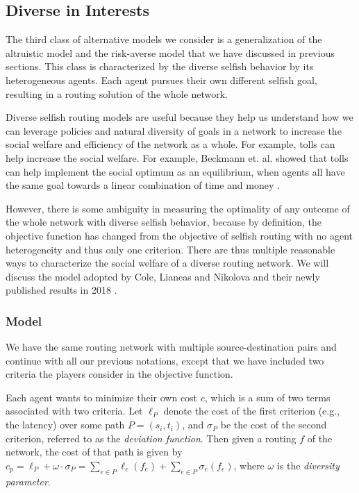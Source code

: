 \subsection{Diverse in Interests}\label{sec:diversity}

The third class of alternative models we consider is a generalization of the altruistic model and the risk-averse model that we have discussed in previous sections. This class is characterized by the diverse selfish behavior by its heterogeneous agents. Each agent pursues their own different selfish goal, resulting in a routing solution of the whole network. 

Diverse selfish routing models are useful because they help us understand how we can leverage policies and natural diversity of goals in a network to increase the social welfare and efficiency of the network as a whole. For example, tolls can help increase the social welfare. For example, Beckmann et. al. showed that tolls can help implement the social optimum as an equilibrium, when agents all have the same goal towards a linear combination of time and money \cite{beckmann1956studies}.

However, there is some ambiguity in measuring the optimality of any outcome of the whole network with diverse selfish behavior, because by definition, the objective function has changed from the objective of selfish routing with no agent heterogeneity and thus only one criterion. There are thus multiple reasonable ways to characterize the social welfare of a diverse routing network. We will discuss the model adopted by Cole, Lianeas and Nikolova and their newly published results in 2018 \cite{ijcai2018-24}.

\subsubsection{Model}

We have the same routing network with multiple source-destination pairs and continue with all our previous notations, except that we have included two criteria the players consider in the objective function.

Each agent wants to minimize their own cost $c$, which is a sum of two terms associated with two criteria. Let $\ell_P$ denote the cost of the first criterion (e.g., the latency) over some path $P=(s_i, t_i)$, and $\sigma_P$ be the cost of the second criterion, referred to as the {\it deviation function}. Then given a routing $f$ of the network, the cost of that path is given by $c_p = \ell_P+\omega\cdot \sigma_P=\sum_{e\in P} \ell_e(f_e)+ \sum_{e\in P}\sigma_e(f_e)$, where $\omega$ is the {\it diversity parameter}.

